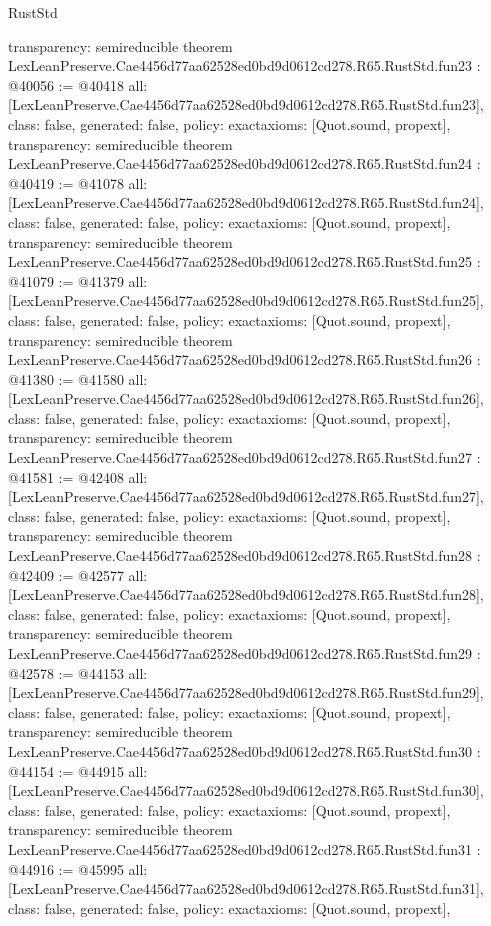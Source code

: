 \begin{lexlean}{RustStd}
\begin{coremodule}
{  transparency: semireducible
}
theorem LexLeanPreserve.Cae4456d77aa62528ed0bd9d0612cd278.R65.RustStd.fun23 : @40056 := @40418 {
  all: [LexLeanPreserve.Cae4456d77aa62528ed0bd9d0612cd278.R65.RustStd.fun23],
  class: false,
  generated: false,
  policy: exact{axioms: [Quot.sound, propext]},
  transparency: semireducible
}
theorem LexLeanPreserve.Cae4456d77aa62528ed0bd9d0612cd278.R65.RustStd.fun24 : @40419 := @41078 {
  all: [LexLeanPreserve.Cae4456d77aa62528ed0bd9d0612cd278.R65.RustStd.fun24],
  class: false,
  generated: false,
  policy: exact{axioms: [Quot.sound, propext]},
  transparency: semireducible
}
theorem LexLeanPreserve.Cae4456d77aa62528ed0bd9d0612cd278.R65.RustStd.fun25 : @41079 := @41379 {
  all: [LexLeanPreserve.Cae4456d77aa62528ed0bd9d0612cd278.R65.RustStd.fun25],
  class: false,
  generated: false,
  policy: exact{axioms: [Quot.sound, propext]},
  transparency: semireducible
}
theorem LexLeanPreserve.Cae4456d77aa62528ed0bd9d0612cd278.R65.RustStd.fun26 : @41380 := @41580 {
  all: [LexLeanPreserve.Cae4456d77aa62528ed0bd9d0612cd278.R65.RustStd.fun26],
  class: false,
  generated: false,
  policy: exact{axioms: [Quot.sound, propext]},
  transparency: semireducible
}
theorem LexLeanPreserve.Cae4456d77aa62528ed0bd9d0612cd278.R65.RustStd.fun27 : @41581 := @42408 {
  all: [LexLeanPreserve.Cae4456d77aa62528ed0bd9d0612cd278.R65.RustStd.fun27],
  class: false,
  generated: false,
  policy: exact{axioms: [Quot.sound, propext]},
  transparency: semireducible
}
theorem LexLeanPreserve.Cae4456d77aa62528ed0bd9d0612cd278.R65.RustStd.fun28 : @42409 := @42577 {
  all: [LexLeanPreserve.Cae4456d77aa62528ed0bd9d0612cd278.R65.RustStd.fun28],
  class: false,
  generated: false,
  policy: exact{axioms: [Quot.sound, propext]},
  transparency: semireducible
}
theorem LexLeanPreserve.Cae4456d77aa62528ed0bd9d0612cd278.R65.RustStd.fun29 : @42578 := @44153 {
  all: [LexLeanPreserve.Cae4456d77aa62528ed0bd9d0612cd278.R65.RustStd.fun29],
  class: false,
  generated: false,
  policy: exact{axioms: [Quot.sound, propext]},
  transparency: semireducible
}
theorem LexLeanPreserve.Cae4456d77aa62528ed0bd9d0612cd278.R65.RustStd.fun30 : @44154 := @44915 {
  all: [LexLeanPreserve.Cae4456d77aa62528ed0bd9d0612cd278.R65.RustStd.fun30],
  class: false,
  generated: false,
  policy: exact{axioms: [Quot.sound, propext]},
  transparency: semireducible
}
theorem LexLeanPreserve.Cae4456d77aa62528ed0bd9d0612cd278.R65.RustStd.fun31 : @44916 := @45995 {
  all: [LexLeanPreserve.Cae4456d77aa62528ed0bd9d0612cd278.R65.RustStd.fun31],
  class: false,
  generated: false,
  policy: exact{axioms: [Quot.sound, propext]},
}
\end{coremodule}
\end{lexlean}

